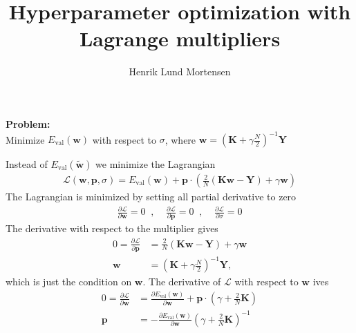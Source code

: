 \documentclass{memoir}
\title{Hyperparameter optimization with Lagrange multipliers}
\author{Henrik Lund Mortensen}
\newcommand{\mat}[1]{\ensuremath{\bm{#1}}}
\renewcommand{\vec}[1]{\ensuremath{\bm{#1}}}
\begin{document}
\maketitle



\vspace{10pt}
\begin{tcolorbox}[]
\textbf{Problem:}\\
Minimize $E_{\text{val}}(\vec{w})$ with respect to $\sigma $, where $\vec{w} = \left(\mat{K} +\gamma \frac{N}{2} \right)^{-1}\vec{Y}$
\end{tcolorbox}
\vspace{10pt}


Instead of $E_{\text{val}}(\vec{\tilde{w}})$ we minimize the Lagrangian
\begin{align}
  \mathcal{L}(\vec{w},\vec{p},\sigma) = E_{\text{val}}(\vec{w}) + \vec{p} \cdot \left(\frac{2}{N} \left(\mat{K}\vec{w} -  \vec{Y} \right) + \gamma \vec{w} \right)
  \label{lagranian}
\end{align}
The Lagrangian is minimized by setting all partial derivative to zero
\begin{align}
  \frac{\partial\mathcal{L}}{\partial \vec{w}} = 0 \;\;,\;\;\;\;
  \frac{\partial\mathcal{L}}{\partial \vec{p}} = 0 \;\;,\;\;\;\;
  \frac{\partial\mathcal{L}}{\partial \sigma} = 0
  \label{dL = 0}
\end{align}
The derivative with respect to the multiplier gives
\begin{align}
 0 =  \frac{\partial \mathcal{L}}{\partial\vec{p}} &= \frac{2}{N} \left(\mat{K}\vec{w} - \vec{Y}  \right) + \gamma \vec{w}  \\
  \vec{w} &= \left(\mat{K} +\gamma \frac{N}{2} \right)^{-1}\vec{Y},
\end{align}
which is just the condition on $\vec{w}$. The derivative of $\mathcal{L}$ with respect to $\vec{w}$ ives
\begin{align}
  0 = \frac{\partial \mathcal{L}}{\partial \vec{w}} &= \frac{\partial E_{\text{val}}(\vec{w})}{\partial\vec{w}} + \vec{p} \cdot \left(\gamma + \frac{2}{N}\mat{K} \right)\\
  \vec{p} &= -\frac{\partial E_{\text{val}}(\vec{w})}{\partial\vec{w}}\left(\gamma + \frac{2}{N}\mat{K} \right)^{-1}
\end{align}
\end{document}
